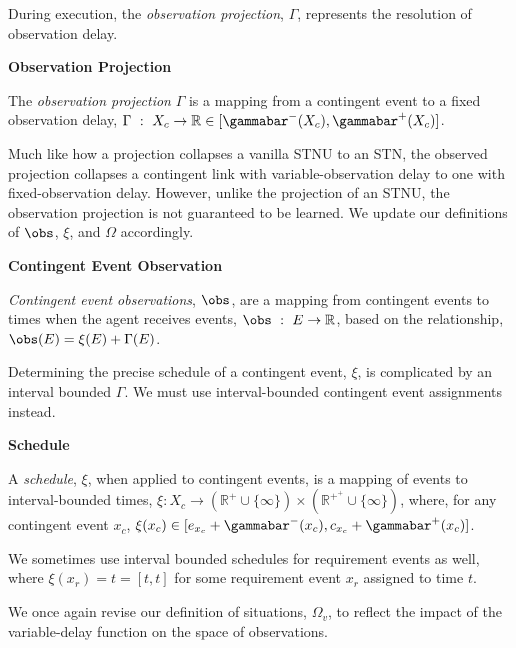 \documentclass[11pt]{article}
\begin{document}
During execution, the \emph{observation projection}, \(\Gamma\), represents the resolution of observation
delay.

\begin{defn}
\textbf{Observation Projection}

The \emph{observation projection} \(\Gamma\) is a mapping from a contingent event to a fixed observation
delay, \(\Gamma~:~X_{c} \rightarrow \mathbb{R} \in [\gammabar^{-}(X_{c}), \gammabar^{+}(X_{c})]\).
\end{defn}

Much like how a projection collapses a vanilla STNU to an STN, the observed projection collapses a
contingent link with variable-observation delay to one with fixed-observation delay. However, unlike
the projection of an STNU, the observation projection is not guaranteed to be learned. We update our
definitions of \(\obs\), \(\xi\), and \(\Omega\) accordingly.

\begin{defn}
\label{defn:vdc-obs}
\textbf{Contingent Event Observation}

\emph{Contingent event observations}, \(\obs\), are a mapping from contingent events to times when the
agent receives events, \(\obs~:~E \rightarrow \mathbb{R}\), based on the relationship, \(\obs(E) =
\xi(E) + \Gamma(E)\).
\end{defn}

Determining the precise schedule of a contingent event, \(\xi\), is complicated by an interval bounded
\(\Gamma\). We must use interval-bounded contingent event assignments instead.

\begin{defn}
\textbf{Schedule}

A \emph{schedule}, \(\xi\), when applied to contingent events, is a mapping of events to interval-bounded
times, \(\xi : X_{c} \rightarrow (\mathbb{R}^+ \cup \{\infty\}) \times (\mathbb{R}^+^+ \cup
\{\infty\})\), where, for any contingent event \(x_{c}\), \(\xi(x_{c}) \in [e_{x_{c}} +
\gammabar^{-}(x_{c}), c_{x_{c}} + \gammabar^{+}(x_{c})]\).
\end{defn}

We sometimes use interval bounded schedules for requirement events as well, where \(\xi(x_{r}) = t =
[t, t]\) for some requirement event \(x_{r}\) assigned to time \(t\).

We once again revise our definition of situations, \(\Omega_{v}\), to reflect the impact of the
variable-delay function on the space of observations.
\end{document}
